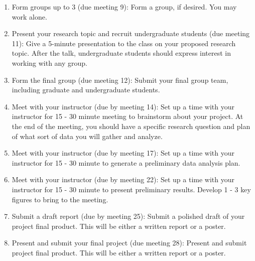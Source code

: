 \documentclass[11pt,onecolumn]{article}
\begin{document}
\begin{enumerate}
  \itemsep0em
\item Form groups up to 3 (due meeting 9): Form a group, if desired. You may work alone.
\item Present your research topic and recruit undergraduate students (due meeting 11): Give a 5-minute presentation to the class on your proposed research topic. After the talk, undergraduate students should express interest in working with any group.
\item Form the final group (due meeting 12): Submit your final group team, including graduate and undergraduate students.
\item Meet with your instructor (due by meeting 14): Set up a time with your instructor for 15 - 30 minute meeting to brainstorm about your project. At the end of the meeting, you should have a specific research question and plan of what sort of data you will gather and analyze.
\item Meet with your instructor (due by meeting 17): Set up a time with your instructor for 15 - 30 minute to generate a preliminary data analysis plan.
\item Meet with your instructor (due by meeting 22): Set up a time with your instructor for 15 - 30 minute to present preliminary results. Develop 1 - 3 key figures to bring to the meeting.
\item Submit a draft report (due by meeting 25): Submit a polished draft of your project final product. This will be either a written report or a poster.
\item Present and submit your final project (due meeting 28): Present and submit project final product. This will be either a written report or a poster.
  
\end{enumerate}
\end{document}
